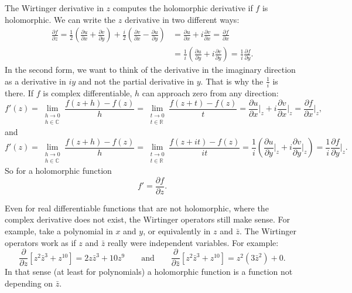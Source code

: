 \documentclass[12pt,openany]{book}
\newcommand{\C}{{\mathbb{C}}}
\newcommand{\R}{{\mathbb{R}}}
\theoremstyle{plain}
\theoremstyle{remark}
\theoremstyle{definition}
\theoremstyle{exercise}
\theoremstyle{example}
\begin{document}
The Wirtinger derivative in $z$ computes the holomorphic derivative
if $f$ is holomorphic.  We can write
the $z$ derivative in two different ways:
\begin{equation*}
\begin{split}
\frac{\partial f}{\partial z} 
=
\frac{1}{2}
\left(
\frac{\partial u}{\partial x} 
+ \frac{\partial v}{\partial y}
\right)
+
\frac{i}{2}
\left( \frac{\partial v}{\partial x} - \frac{\partial u}{\partial y}
\right) 
& =
\frac{\partial u}{\partial x} 
+ i \frac{\partial v}{\partial x}
 =
\frac{\partial f}{\partial x}
\\
& =
\frac{1}{i} \left(
\frac{\partial u}{\partial y}
+ i
\frac{\partial v}{\partial y} 
\right)
 =
\frac{1}{i}
\frac{\partial f}{\partial y}
.
\end{split}
\end{equation*}
In the second form, we want to think of the derivative in
the imaginary direction as a derivative in $iy$ and not the partial
derivative in $y$.  That is why the $\frac{1}{i}$ is there.
If $f$ is complex differentiable, $h$ can
approach zero from any direction:
\begin{equation*}
f'(z) =
\lim_{\substack{h \to 0\\h\in\C}}
\frac{f(z+h)-f(z)}{h}
=
\lim_{\substack{t \to 0\\t\in\R}}
\frac{f(z+t)-f(z)}{t}
=
\frac{\partial u}{\partial x} \Big|_z
+ i \frac{\partial v}{\partial x}\Big|_z
 =
\frac{\partial f}{\partial x} \Big|_z ,
\end{equation*}
and
\begin{equation*}
f'(z) =
\lim_{\substack{h \to 0\\h\in\C}}
\frac{f(z+h)-f(z)}{h}
=
\lim_{\substack{t \to 0\\t\in\R}}
\frac{f(z+it)-f(z)}{it}
=
\frac{1}{i}
\left(
\frac{\partial u}{\partial y}  \Big|_z
+ i \frac{\partial v}{\partial y} \Big|_z
\right)
 =
\frac{1}{i}
\frac{\partial f}{\partial y} \Big|_z .
\end{equation*}
So for a holomorphic function
\begin{equation*}
f' =
\frac{\partial f}{\partial z} .
\end{equation*}

Even for real differentiable functions that are not holomorphic,
where the complex derivative does not exist, the Wirtinger operators still
make sense.  For example, take a polynomial in $x$ and $y$, or equivalently
in $z$ and $\bar{z}$.
The Wirtinger operators
work as if $z$ and $\bar{z}$ really were independent variables.  For example:
\begin{equation*}
\frac{\partial}{\partial z}
\left[ z^2 \bar{z}^3 + z^{10} \right]
=
2z \bar{z}^3 + 10 z^{9}
\qquad
\text{and}
\qquad
\frac{\partial}{\partial \bar{z}}
\left[ z^2 \bar{z}^3 + z^{10} \right]
=
z^2 ( 3 \bar{z}^2 ) + 0 .
\end{equation*}
In that sense (at least for polynomials) a holomorphic function is a
function not depending on $\bar{z}$.
\end{document}
